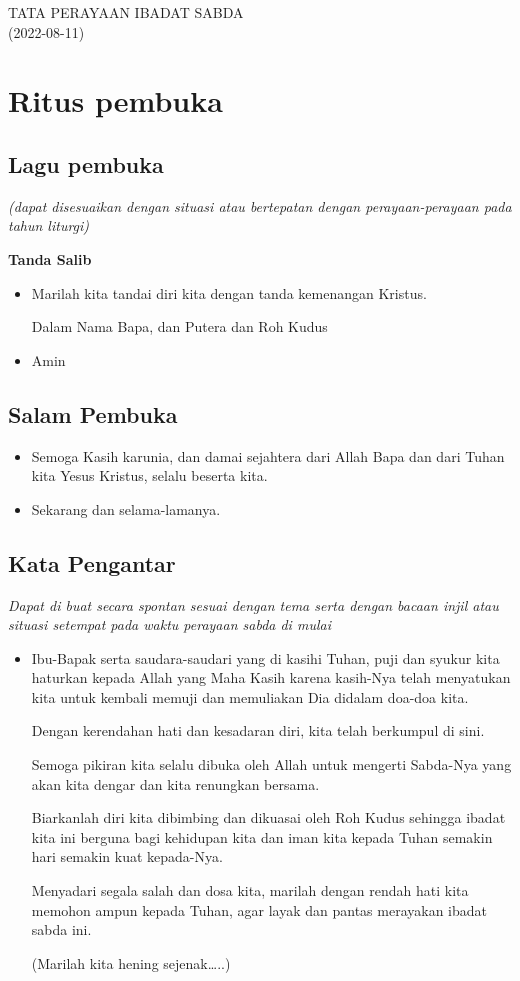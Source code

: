 \documentclass[a4paper,12pt]{article}
\title{}
\author{}
\date{2018-02-08}
\newcommand{\BU}[1]{\begin{itemize} \item[U:] #1 \end{itemize}}
\newcommand{\BP}[1]{\begin{itemize} \item[P:] #1 \end{itemize}}
\begin{document}
	\begin{center}
		\Large{TATA PERAYAAN IBADAT SABDA}\\
        \large{(2022-08-11)}
	\end{center}

\section{Ritus pembuka}
 \subsection*{Lagu pembuka}

\textit{(dapat disesuaikan dengan situasi atau bertepatan dengan perayaan-perayaan pada tahun liturgi)
}

 \textbf{Tanda Salib}

\BP{Marilah kita tandai diri kita dengan tanda kemenangan Kristus. 

Dalam Nama Bapa, dan Putera dan Roh Kudus}

\BU{Amin}

\subsection*{Salam Pembuka}

\BP{Semoga Kasih karunia, dan damai sejahtera dari Allah Bapa dan dari Tuhan kita Yesus Kristus, selalu beserta kita.}

\BU{Sekarang dan selama-lamanya.}

 \subsection*{Kata Pengantar}

\textit{ Dapat di buat secara spontan sesuai dengan tema serta dengan bacaan injil atau situasi 
 setempat pada waktu perayaan sabda di mulai
}

\BP{Ibu-Bapak serta saudara-saudari yang di kasihi Tuhan, puji dan syukur kita haturkan kepada Allah yang Maha Kasih karena
kasih-Nya telah menyatukan kita  untuk kembali memuji dan memuliakan Dia didalam doa-doa kita.

Dengan kerendahan hati dan kesadaran diri, kita telah berkumpul di sini.

Semoga pikiran kita selalu dibuka oleh Allah untuk mengerti Sabda-Nya yang akan kita dengar dan kita renungkan bersama.

Biarkanlah diri kita dibimbing dan dikuasai oleh Roh Kudus sehingga ibadat kita ini berguna bagi kehidupan kita dan iman
kita kepada Tuhan semakin hari semakin kuat kepada-Nya.

Menyadari segala salah dan dosa kita, marilah dengan rendah hati kita memohon ampun kepada Tuhan, agar layak dan pantas
merayakan ibadat sabda ini.

(Marilah kita hening sejenak{\dots}..)
}
\end{document}
